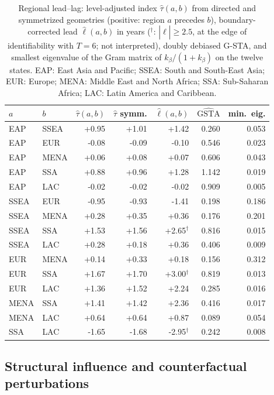 \documentclass[12pt]{article}
\theoremstyle{definition}
\begin{document}
\begin{table}[hp]
\caption{Regional lead--lag: level-adjusted index $\hat\tau(a,b)$ from directed and symmetrized geometries (positive: region $a$ precedes $b$), boundary-corrected lead $\hat\ell(a,b)$ in years ($^\dagger$: $|\hat\ell|\ge2.5$, at the edge of identifiability with $T=6$; not interpreted), doubly debiased G-STA, and smallest eigenvalue of the Gram matrix of $k_\beta/(1+k_\beta)$ on the twelve states. EAP: East Asia and Pacific; SSEA: South and South-East Asia; EUR: Europe; MENA: Middle East and North Africa; SSA: Sub-Saharan Africa; LAC: Latin America and Caribbean.}\label{tab:reg}
\centering\scriptsize
\begin{tabular}{llrrrrr}
\toprule
$a$ & $b$ & $\hat\tau(a,b)$ & $\hat\tau$ symm. & $\hat\ell(a,b)$ & $\widehat{\mathrm{GSTA}}$ & min.\ eig.\\
\midrule
EAP & SSEA & +0.95 & +1.01 & +1.42 & 0.260 & 0.053\\
EAP & EUR & -0.08 & -0.09 & -0.10 & 0.546 & 0.023\\
EAP & MENA & +0.06 & +0.08 & +0.07 & 0.606 & 0.043\\
EAP & SSA & +0.88 & +0.96 & +1.28 & 1.142 & 0.019\\
EAP & LAC & -0.02 & -0.02 & -0.02 & 0.909 & 0.005\\
SSEA & EUR & -0.95 & -0.93 & -1.41 & 0.198 & 0.186\\
SSEA & MENA & +0.28 & +0.35 & +0.36 & 0.176 & 0.201\\
SSEA & SSA & +1.53 & +1.56 & +2.65$^\dagger$ & 0.816 & 0.015\\
SSEA & LAC & +0.28 & +0.18 & +0.36 & 0.406 & 0.009\\
EUR & MENA & +0.14 & +0.33 & +0.18 & 0.156 & 0.312\\
EUR & SSA & +1.67 & +1.70 & +3.00$^\dagger$ & 0.819 & 0.013\\
EUR & LAC & +1.36 & +1.52 & +2.24 & 0.285 & 0.016\\
MENA & SSA & +1.41 & +1.42 & +2.36 & 0.416 & 0.017\\
MENA & LAC & +0.64 & +0.64 & +0.87 & 0.089 & 0.054\\
SSA & LAC & -1.65 & -1.68 & -2.95$^\dagger$ & 0.242 & 0.008\\
\bottomrule
\end{tabular}

\end{table}

\subsection{Structural influence and counterfactual perturbations}\label{sec:influence}
\end{document}
